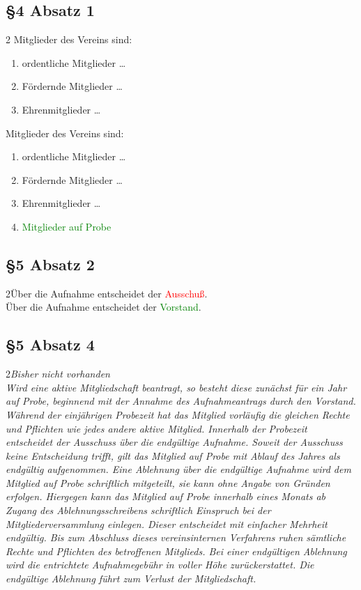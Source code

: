 \documentclass[10pt,a4paper,parskip=half]{scrartcl}
\newcommand{\new}[1]{\textcolor{Green}{#1}}
\newcommand{\old}[1]{\textcolor{Red}{#1}}
\newcommand{\compare}[3]{\subsection*{#1}\begin{multicols}{2}#2\columnbreak\\#3\end{multicols}}
\begin{document}
  \subsection*{§4 Absatz 1}
  \begin{multicols}{2}
    Mitglieder des Vereins sind:
    \begin{enumerate}[noitemsep]
      \item ordentliche Mitglieder \dots
      \item Fördernde Mitglieder \dots 
      \item Ehrenmitglieder \dots
    \end{enumerate}
    \columnbreak
    Mitglieder des Vereins sind:
    \begin{enumerate}[noitemsep]
      \item ordentliche Mitglieder \dots
      \item Fördernde Mitglieder \dots 
      \item Ehrenmitglieder \dots
      \item \new{Mitglieder auf Probe}
    \end{enumerate}
    \end{multicols}

    \compare{§5 Absatz 2}{Über die Aufnahme entscheidet der \old{Ausschuß}.}{Über die Aufnahme entscheidet der \new{Vorstand}.}
    \compare{§5 Absatz 4}{\em Bisher nicht vorhanden \em}{Wird eine aktive Mitgliedschaft beantragt,
    so besteht diese zunächst für ein Jahr auf Probe,
    beginnend mit der Annahme des Aufnahmeantrags durch den Vorstand.
    Während der einjährigen Probezeit hat das Mitglied vorläufig die gleichen Rechte und Pflichten wie jedes andere aktive Mitglied.
    Innerhalb der Probezeit entscheidet der Ausschuss über die endgültige Aufnahme.
    Soweit der Ausschuss keine Entscheidung trifft,
    gilt das Mitglied auf Probe mit Ablauf des Jahres als endgültig aufgenommen.
    Eine Ablehnung über die endgültige Aufnahme wird dem Mitglied auf Probe schriftlich mitgeteilt,
    sie kann ohne Angabe von Gründen erfolgen.
    Hiergegen kann das Mitglied auf Probe innerhalb eines Monats ab Zugang des Ablehnungsschreibens schriftlich Einspruch bei der Mitgliederversammlung einlegen.
    Dieser entscheidet mit einfacher Mehrheit endgültig.
    Bis zum Abschluss dieses vereinsinternen Verfahrens ruhen sämtliche Rechte und Pflichten des betroffenen Mitglieds.
    Bei einer endgültigen Ablehnung wird die entrichtete Aufnahmegebühr in voller Höhe zurückerstattet.
    Die endgültige Ablehnung führt zum Verlust der Mitgliedschaft.}
\end{document}
